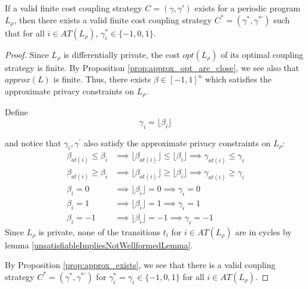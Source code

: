 
\begin{lemma}\label{integersAreEnoughForATLemma}
    If a valid finite cost coupling strategy $C = (\gamma, \gamma')$ exists for a periodic program $L_\rho$, then there exists a valid finite cost coupling strategy $C^*= (\gamma^*, \gamma^{*\prime})$ such that for all $i\in AT(L_\rho)$, $\gamma_i^*\in \{-1, 0, 1\}$. 
\end{lemma}
\begin{proof}
    Since $L_\rho$ is differentially private, the cost $opt(L_\rho)$ of its optimal coupling strategy is finite. By Proposition \ref{prop:approx_opt_are_close}, we see also that $approx(L)$ is finite. Thus, there exists $\beta \in [-1, 1]^{n}$ which satisfies the approximate privacy constraints on $L_\rho$.

    Define 
    \[\gamma_i = \lfloor \beta_i \rfloor \]

    and notice that $\gamma_i, \gamma^{\prime}$ also satisfy the approximate privacy constraints on $L_\rho$:
    \begin{align*}
        \beta_{at(i)} \leq \beta_i &\implies \lfloor \beta_{at(i)} \rfloor \leq \lfloor \beta_i \rfloor \implies \gamma_{at(i)} \leq \gamma_i\\
        \beta_{at(i)} \geq \beta_i &\implies \lfloor \beta_{at(i)} \rfloor \geq \lfloor \beta_i \rfloor \implies \gamma_{at(i)} \geq \gamma_i\\
        \beta_{i} = 0 &\implies \lfloor \beta_{i} \rfloor = 0 \implies \gamma_{i} = 0\\
        \beta_{i} = 1 &\implies \lfloor \beta_{i} \rfloor = 1 \implies \gamma_{i} = 1\\
        \beta_{i} = -1 &\implies \lfloor \beta_{i} \rfloor = -1 \implies \gamma_{i} = -1
    \end{align*}
    Since $L_\rho$ is private, none of the transitions $t_i$ for $i \in AT(L_\rho)$ are in cycles by lemma \ref{unsatisfiableImpliesNotWellformedLemma}.
    
    By Proposition \ref{prop:approx_exists}, we see that there is a valid coupling strategy $C^* = (\gamma^*, \gamma^{*\prime})$ for $\gamma^*_i = \gamma_i \in \{-1, 0, 1\}$ for all $i \in AT(L_\rho)$.
\end{proof}



